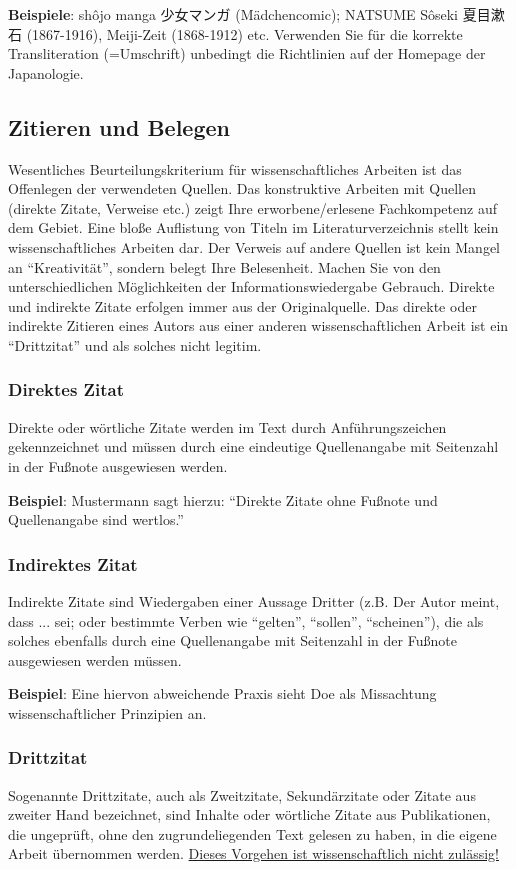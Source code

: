 \documentclass{japo}
\begin{document}
\textbf{Beispiele}: shôjo manga 少女マンガ (Mädchencomic); NATSUME Sôseki 夏目漱石 (1867-1916), Meiji-Zeit (1868-1912) etc. Verwenden Sie für die korrekte Transliteration (=Umschrift) unbedingt die Richtlinien auf der Homepage der Japanologie.

\subsection{Zitieren und Belegen}
Wesentliches Beurteilungskriterium für wissenschaftliches Arbeiten ist das Offenlegen der verwendeten Quellen. Das konstruktive Arbeiten mit Quellen (direkte Zitate, Verweise etc.) zeigt Ihre erworbene/erlesene Fachkompetenz auf dem Gebiet. Eine bloße Auflistung von Titeln im Literaturverzeichnis stellt kein wissenschaftliches Arbeiten dar. Der Verweis auf andere Quellen ist kein Mangel an \enquote{Kreativität}, sondern belegt Ihre Belesenheit. Machen Sie von den unterschiedlichen Möglichkeiten der Informationswiedergabe Gebrauch. Direkte und indirekte Zitate erfolgen immer aus der Originalquelle. Das direkte oder indirekte Zitieren eines Autors aus einer anderen wissenschaftlichen Arbeit ist ein \enquote{Drittzitat} und als solches nicht legitim.

\subsubsection{Direktes Zitat}
Direkte oder wörtliche Zitate werden im Text durch Anführungszeichen gekennzeichnet und müssen durch eine eindeutige Quellenangabe mit Seitenzahl in der Fußnote ausgewiesen werden.

\textbf{Beispiel}: Mustermann sagt hierzu: \enquote{Direkte Zitate ohne Fußnote und Quellenangabe sind wertlos.}%

\subsubsection{Indirektes Zitat}
Indirekte Zitate sind Wiedergaben einer Aussage Dritter (z.B. Der Autor meint, dass ... sei; oder bestimmte Verben wie \enquote{gelten}, \enquote{sollen}, \enquote{scheinen}), die als solches ebenfalls durch eine Quellenangabe mit Seitenzahl in der Fußnote ausgewiesen werden müssen.

\textbf{Beispiel}: Eine hiervon abweichende Praxis sieht Doe als Missachtung wissenschaftlicher Prinzipien an.%

\subsubsection{Drittzitat}
Sogenannte Drittzitate, auch als Zweitzitate, Sekundärzitate oder Zitate aus zweiter Hand bezeichnet, sind Inhalte oder wörtliche Zitate aus Publikationen, die ungeprüft, ohne den zugrundeliegenden Text gelesen zu haben, in die eigene Arbeit übernommen werden. \underline{Dieses Vorgehen ist wissenschaftlich nicht zulässig!}
\end{document}
